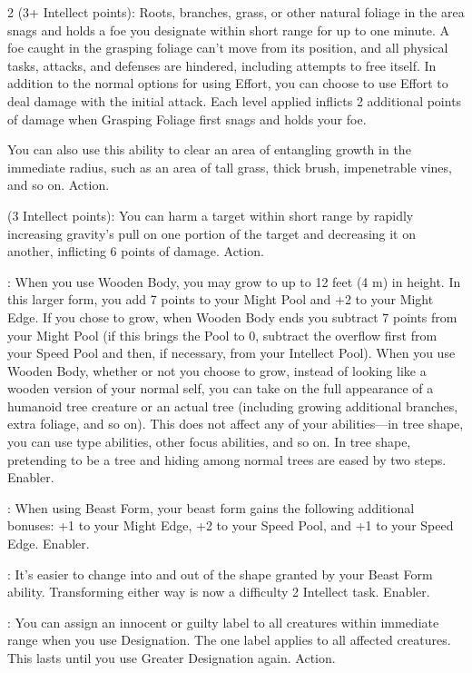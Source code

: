 \begin{multicols}{2}
 (3+ Intellect points): Roots, branches, grass, or other natural foliage in the area snags and holds a foe you designate within short range for up to one minute. A foe caught in the grasping foliage can’t move from its position, and all physical tasks, attacks, and defenses are hindered, including attempts to free itself. In addition to the normal options for using Effort, you can choose to use Effort to deal damage with the initial attack. Each level applied inflicts 2 additional points of damage when Grasping Foliage first snags and holds your foe. 

You can also use this ability to clear an area of entangling growth in the immediate radius, such as an area of tall grass, thick brush, impenetrable vines, and so on. Action. 
 
 (3 Intellect points): You can harm a target within short range by rapidly increasing gravity’s pull on one portion of the target and decreasing it on another, inflicting 6 points of damage. Action.
 
: When you use Wooden Body, you may grow to up to 12 feet (4 m) in height. In this larger form, you add 7 points to your Might Pool and +2 to your Might Edge. If you chose to grow, when Wooden Body ends you subtract 7 points from your Might Pool (if this brings the Pool to 0, subtract the overflow first from your Speed Pool and then, if necessary, from your Intellect Pool). When you use Wooden Body, whether or not you choose to grow, instead of looking like a wooden version of your normal self, you can take on the full appearance of a humanoid tree creature or an actual tree (including growing additional branches, extra foliage, and so on). This does not affect any of your abilities—in tree shape, you can use type abilities, other focus abilities, and so on. In tree shape, pretending to be a tree and hiding among normal trees are eased by two steps. Enabler.

: When using Beast Form, your beast form gains the following additional bonuses: +1 to your Might Edge, +2 to your Speed Pool, and +1 to your Speed Edge. Enabler. 
 
: It’s easier to change into and out of the shape granted by your Beast Form ability. Transforming either way is now a difficulty 2 Intellect task. Enabler. 
 
: You can assign an innocent or guilty label to all creatures within immediate range when you use Designation. The one label applies to all affected creatures. This lasts until you use Greater Designation again. Action. 
 

\end{multicols}
